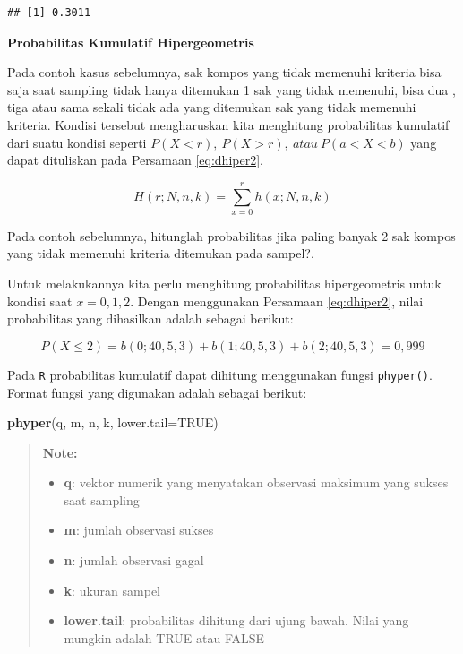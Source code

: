 \documentclass[]{book}
\newenvironment{Shaded}{\begin{snugshade}}{\end{snugshade}}
\newcommand{\KeywordTok}[1]{\textcolor[rgb]{0.13,0.29,0.53}{\textbf{#1}}}
\newcommand{\DataTypeTok}[1]{\textcolor[rgb]{0.13,0.29,0.53}{#1}}
\newcommand{\OtherTok}[1]{\textcolor[rgb]{0.56,0.35,0.01}{#1}}
\newcommand{\NormalTok}[1]{#1}
\providecommand{\tightlist}{%
  \setlength{\itemsep}{0pt}\setlength{\parskip}{0pt}}
\begin{document}
\begin{verbatim}
## [1] 0.3011
\end{verbatim}

\textbf{Probabilitas Kumulatif Hipergeometris}

Pada contoh kasus sebelumnya, sak kompos yang tidak memenuhi kriteria
bisa saja saat sampling tidak hanya ditemukan 1 sak yang tidak memenuhi,
bisa dua , tiga atau sama sekali tidak ada yang ditemukan sak yang tidak
memenuhi kriteria. Kondisi tersebut mengharuskan kita menghitung
probabilitas kumulatif dari suatu kondisi seperti
\(P\left(X<r\right),\ P\left(X>r\right),\ atau\ P\left(a<X<b\right)\)
yang dapat dituliskan pada Persamaan \eqref{eq:dhiper2}.

\begin{equation}
   H\left(r;N,n,k\right)=\sum_{x=0}^rh\left(x;N,n,k\right)
  \label{eq:dhiper2}
\end{equation}

Pada contoh sebelumnya, hitunglah probabilitas jika paling banyak 2 sak
kompos yang tidak memenuhi kriteria ditemukan pada sampel?.

Untuk melakukannya kita perlu menghitung probabilitas hipergeometris
untuk kondisi saat \(x=0,1,2\). Dengan menggunakan Persamaan
\eqref{eq:dhiper2}, nilai probabilitas yang dihasilkan adalah sebagai
berikut:

\[
P\left(X\le2\right)=b\left(0;40,5,3\right)+b\left(1;40,5,3\right)+b\left(2;40,5,3\right)=0,999
\]

Pada \texttt{R} probabilitas kumulatif dapat dihitung menggunakan fungsi
\texttt{phyper()}. Format fungsi yang digunakan adalah sebagai berikut:

\begin{Shaded}
\begin{Highlighting}[]
\KeywordTok{phyper}\NormalTok{(q, m, n, k, }\DataTypeTok{lower.tail=}\OtherTok{TRUE}\NormalTok{)}
\end{Highlighting}
\end{Shaded}

\begin{quote}
\textbf{Note: }

\begin{itemize}
\tightlist
\item
  \textbf{q}: vektor numerik yang menyatakan observasi maksimum yang
  sukses saat sampling
\item
  \textbf{m}: jumlah observasi sukses
\item
  \textbf{n}: jumlah observasi gagal
\item
  \textbf{k}: ukuran sampel
\item
  \textbf{lower.tail}: probabilitas dihitung dari ujung bawah. Nilai
  yang mungkin adalah TRUE atau FALSE
\end{itemize}
\end{quote}
\end{document}
